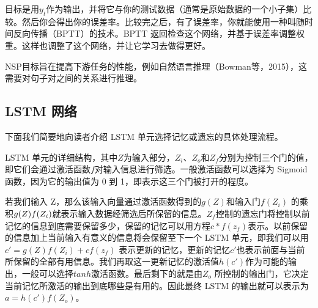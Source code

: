 \documentclass[lang=cn,11pt,a4paper]{elegantpaper}
\begin{document}
目标是用$y_t$作为输出，并将它与你的测试数据（通常是原始数据的一个小子集）比较。然后你会得出你的误差率。比较完之后，有了误差率，你就能使用一种叫随时间反向传播（BPTT）的技术。BPTT 返回检查这个网络，并基于误差率调整权重。这样也调整了这个网络，并让它学习去做得更好。

NSP目标旨在提高下游任务的性能，例如自然语言推理（Bowman等，2015），这需要对句子对之间的关系进行推理。

\subsection{LSTM 网络}
下面我们简要地向读者介绍 LSTM 单元选择记忆或遗忘的具体处理流程。

LSTM 单元的详细结构，其中$Z$为输入部分，$Z_i$、$Z_o$和$Z_f$分别为控制三个门的值，即它们会通过激活函数$f$对输入信息进行筛选。一般激活函数可以选择为 Sigmoid 函数，因为它的输出值为 0 到 1，即表示这三个门被打开的程度。

若我们输入 Z，那么该输入向量通过激活函数得到的$g(Z)$和输入门$f(Z_i)$ 的乘积$g(Z)\* f(Z_i )$就表示输入数据经筛选后所保留的信息。$Z_f$控制的遗忘门将控制以前记忆的信息到底需要保留多少，保留的记忆可以用方程$c*f(z_f)$表示。以前保留的信息加上当前输入有意义的信息将会保留至下一个 LSTM 单元，即我们可以用$c'= g(Z)f(Z_i)+cf(z_f)$ 表示更新的记忆，更新的记忆$c'$也表示前面与当前所保留的全部有用信息。我们再取这一更新记忆的激活值$h(c')$作为可能的输出，一般可以选择$tanh$激活函数。最后剩下的就是由$Z_o$ 所控制的输出门，它决定当前记忆所激活的输出到底哪些是有用的。因此最终 LSTM 的输出就可以表示为$a = h(c')f(Z_o)$。



\end{document}
